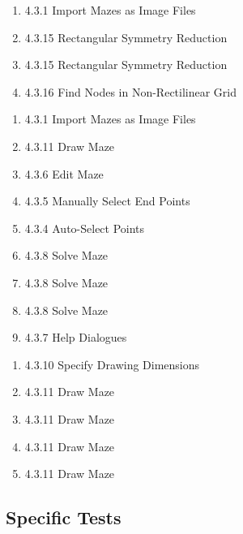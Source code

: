 \documentclass[titlepage]{article}
\begin{document}
\begin{enumerate} [{Obj 8.}1:]
\item 4.3.1 Import Mazes as Image Files
\item 4.3.15 Rectangular Symmetry Reduction
\item 4.3.15 Rectangular Symmetry Reduction
\item 4.3.16 Find Nodes in Non-Rectilinear Grid
\end{enumerate}
\begin{enumerate} [{Obj 9.}1:]
\item 4.3.1 Import Mazes as Image Files
\item 4.3.11 Draw Maze
\item 4.3.6 Edit Maze
\item 4.3.5 Manually Select End Points
\item 4.3.4 Auto-Select Points
\item 4.3.8 Solve Maze
\item 4.3.8 Solve Maze
\item 4.3.8 Solve Maze
\item 4.3.7 Help Dialogues
\end{enumerate}
\begin{enumerate} [{Obj 10.}1:]
\item 4.3.10 Specify Drawing Dimensions
\item 4.3.11 Draw Maze
\item 4.3.11 Draw Maze
\item 4.3.11 Draw Maze
\item 4.3.11 Draw Maze
\end{enumerate}

\subsection{Specific Tests}
\end{document}
